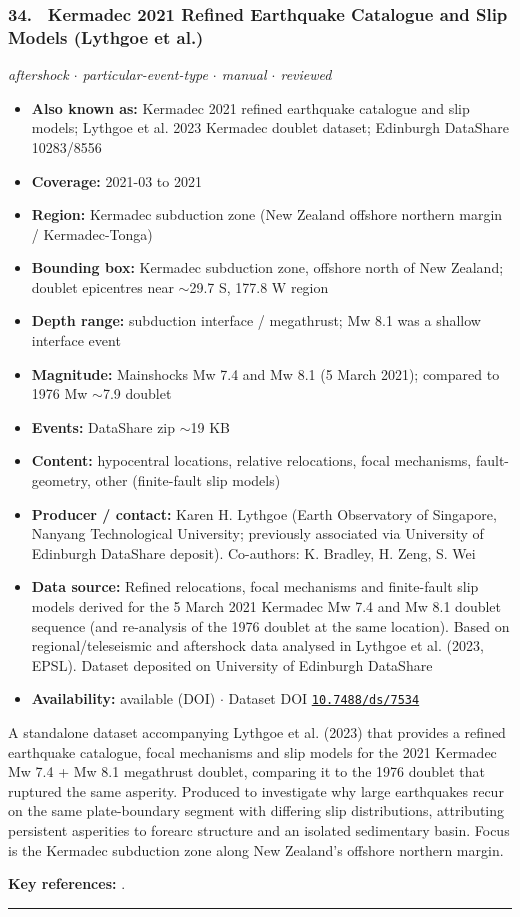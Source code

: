 \documentclass[10pt,a4paper]{article}
\newcommand{\catentryrule}{\par\vspace{3pt}\noindent\textcolor{rulegrey}{\rule{\linewidth}{0.3pt}}\par\vspace{5pt}}
\newcommand{\kv}[2]{\item \textbf{#1:} #2}
\begin{document}
\subsubsection*{\hypertarget{c:34}{34.}~ Kermadec 2021 Refined Earthquake Catalogue and Slip Models (Lythgoe et al.)}
{\small\itshape aftershock $\cdot$ particular-event-type $\cdot$ manual $\cdot$ reviewed}\par\vspace{2pt}
\begin{itemize}[leftmargin=1.3em,itemsep=0.6pt,topsep=1pt,parsep=0pt]
\kv{Also known as}{Kermadec 2021 refined earthquake catalogue and slip models; Lythgoe et al. 2023 Kermadec doublet dataset; Edinburgh DataShare 10283/8556}
\kv{Coverage}{2021-03 to 2021}
\kv{Region}{Kermadec subduction zone (New Zealand offshore northern margin / Kermadec-Tonga)}
\kv{Bounding box}{Kermadec subduction zone, offshore north of New Zealand; doublet epicentres near $\sim$29.7 S, 177.8 W region}
\kv{Depth range}{subduction interface / megathrust; Mw 8.1 was a shallow interface event}
\kv{Magnitude}{Mainshocks Mw 7.4 and Mw 8.1 (5 March 2021); compared to 1976 Mw $\sim$7.9 doublet}
\kv{Events}{DataShare zip $\sim$19 KB}
\kv{Content}{hypocentral locations, relative relocations, focal mechanisms, fault-geometry, other (finite-fault slip models)}
\kv{Producer / contact}{Karen H. Lythgoe (Earth Observatory of Singapore, Nanyang Technological University; previously associated via University of Edinburgh DataShare deposit). Co-authors: K. Bradley, H. Zeng, S. Wei}
\kv{Data source}{Refined relocations, focal mechanisms and finite-fault slip models derived for the 5 March 2021 Kermadec Mw 7.4 and Mw 8.1 doublet sequence (and re-analysis of the 1976 doublet at the same location). Based on regional/teleseismic and aftershock data analysed in Lythgoe et al. (2023, EPSL). Dataset deposited on University of Edinburgh DataShare}
\kv{Availability}{available (DOI) $\cdot$ Dataset DOI \href{https://doi.org/10.7488/ds/7534}{\nolinkurl{10.7488/ds/7534}}}
\end{itemize}
\par\vspace{2pt}A standalone dataset accompanying Lythgoe et al. (2023) that provides a refined earthquake catalogue, focal mechanisms and slip models for the 2021 Kermadec Mw 7.4 + Mw 8.1 megathrust doublet, comparing it to the 1976 doublet that ruptured the same asperity. Produced to investigate why large earthquakes recur on the same plate-boundary segment with differing slip distributions, attributing persistent asperities to forearc structure and an isolated sedimentary basin. Focus is the Kermadec subduction zone along New Zealand's offshore northern margin.
\par\vspace{2pt}\textbf{Key references:} \cite{Lythgoe2023,Lythgoe2023a}.
\catentryrule
\end{document}

